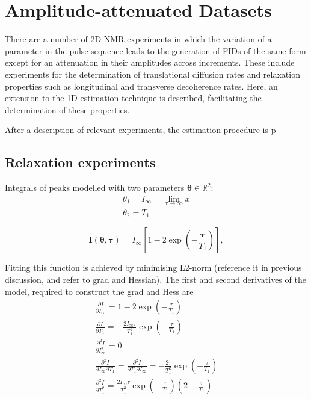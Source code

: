 \section{Amplitude-attenuated Datasets}
\label{sec:seq}

There are a number of \ac{2D} \ac{NMR} experiments in which the
variation of a parameter in the pulse sequence leads to the generation of
\acp{FID} of the same form except for an attenuation in their amplitudes across
increments. These include experiments for the determination of translational
diffusion rates and relaxation properties such as longitudinal and transverse
decoherence rates. Here, an extension to the \ac{1D} estimation technique is
described, facilitating the determination of these properties.

After a description of relevant experiments, the estimation procedure is
p

\subsection{Relaxation experiments}
\label{sec:relaxation_experiments}

Integrals of peaks modelled with two parameters $\symbf{\theta} \in \mathbb{R}^2$:
\begin{subequations}
   \begin{gather}
        \theta_1 = I_{\infty} = \lim_{\tau \rightarrow \infty} x\\
        \theta_2 = T_1
   \end{gather}
\end{subequations}

\begin{equation}
    \symbf{I}\left(\symbf{\theta}, \symbf{\tau}\right) =
        I_{\infty} \left[ 1 - 2 \exp\left( -\frac{\symbf{\tau}}{T_1}\right) \right],
\end{equation}

Fitting this function is achieved by minimising L2-norm (reference it in
previous discussion, and refer to grad and Hessian). The first and second
derivatives of the model, required to construct the grad and Hess are
\begin{subequations}
    \begin{gather}
        \frac{\partial I}{\partial I_{\infty}} =
            1 - 2 \exp \left( -\frac{\tau}{T_1} \right)\\
        \frac{\partial I}{\partial T_1} =
        -\frac{2 I_{\infty} \tau}{T_1^2} \exp\left( -\frac{\tau}{T_1} \right)\\
        \frac{\partial^2 I}{\partial I_{\infty}^2} = 0\\
        \frac{\partial^2 I}{\partial I_{\infty} \partial T_1} =
            \frac{\partial^2 I}{\partial T_1 \partial I_{\infty}} =
            -\frac{2 \tau}{T_1^2} \exp\left(- \frac{\tau}{T_1} \right)\\
        \frac{\partial^2 I}{\partial T_1^2} =
            \frac{2 I_{\infty} \tau}{T_1^3} \exp\left(- \frac{\tau}{T_1} \right)
            \left(2 - \frac{\tau}{T_1}\right)
    \end{gather}
\end{subequations}

